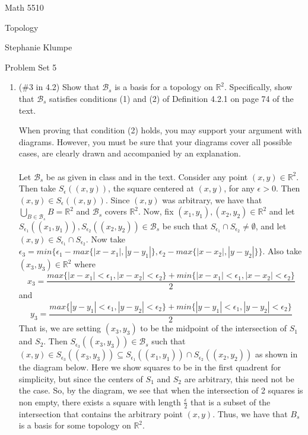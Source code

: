 \documentclass[12pt]{article}
\begin{document}
\noindent Math 5510

\noindent Topology

\noindent Stephanie Klumpe

\vspace{.2in}
\begin{center}
Problem Set 5
\end{center}


\begin{enumerate}
\item (\#3 in 4.2) Show that $\mathcal{B}_s$ is a basis for a topology on $\mathbb{R}^2$. Specifically, show that $\mathcal{B}_s$ satisfies conditions (1) and (2) of Definition 4.2.1 on page 74 of the text.

When proving that condition (2) holds, you may support your argument with diagrams. However, you must be sure that your diagrams cover all possible cases, are clearly drawn and accompanied by an explanation.\\\\
Let $\mathcal{B}_s$ be as given in class and in the text. Consider any point $(x,y)\in\mathbb{R}^2$. Then take $S_{\epsilon}((x,y))$, the square centered at $(x,y)$, for any $\epsilon>0$. Then $(x,y)\in S_{\epsilon}((x,y))$. Since $(x,y)$ was arbitrary, we have that $\bigcup_{B\in\mathcal{B}_s}B=\mathbb{R}^2$ and $\mathcal{B}_s$ covers $\mathbb{R}^2$. Now, fix $(x_1,y_1), (x_2,y_2)\in\mathbb{R}^2$ and let $S_{\epsilon_1}((x_1,y_1)), S_{\epsilon_2}((x_2,y_2))\in\mathcal{B}_s$ be such that $S_{\epsilon_1}\cap S_{\epsilon_2}\neq\emptyset$, and let $(x,y)\in S_{\epsilon_1}\cap S_{\epsilon_2}$. Now take $\epsilon_3=min\{\epsilon_1-max\{|x-x_1|,|y-y_1|\}, \epsilon_2-max\{|x-x_2|, |y-y_2|\}\}$. Also take $(x_3,y_3)\in\mathbb{R}^2$ where $$x_3=\frac{max\{|x-x_1|<\epsilon_1, |x-x_2|<\epsilon_2\}+min\{|x-x_1|<\epsilon_1, |x-x_2|<\epsilon_2\}}{2}$$and $$y_3=\frac{max\{|y-y_1|<\epsilon_1, |y-y_2|<\epsilon_2\}+min\{|y-y_1|<\epsilon_1, |y-y_2|<\epsilon_2\}}{2}$$That is, we are setting $(x_3,y_3)$ to be the midpoint of the intersection of $S_1$ and $S_2$. Then $S_{\epsilon_3}((x_3,y_3))\in\mathcal{B}_s$ such that $(x,y)\in S_{\epsilon_3}((x_3,y_3))\subseteq S_{\epsilon_1}((x_1,y_1))\cap S_{\epsilon_2}((x_2,y_2))$ as shown in the diagram below. Here we show squares to be in the first quadrent for simplicity, but since the centers of $S_1$ and $S_2$ are arbitrary, this need not be the case. So, by the diagram, we see that when the intersection of 2 squares is non empty, there exists a square with length $\frac{\epsilon}{2}$ that is a subset of the intersection that contains the arbitrary point $(x,y)$. Thus, we have that $B_s$ is a basis for some topology on $\mathbb{R}^2$.

\end{enumerate}
\end{document}
